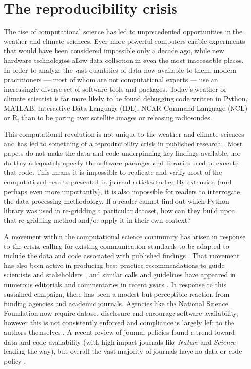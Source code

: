 \section{The reproducibility crisis}

The rise of computational science has led to unprecedented opportunities in the weather and climate sciences. Ever more powerful computers enable experiments that would have been considered impossible only a decade ago, while new hardware technologies allow data collection in even the most inaccessible places. In order to analyze the vast quantities of data now available to them, modern practitioners –-- most of whom are not computational experts –-- use an increasingly diverse set of software tools and packages. Today's weather or climate scientist is far more likely to be found debugging code written in Python, MATLAB, Interactive Data Language (IDL), NCAR Command Language (NCL) or R, than to be poring over satellite images or releasing radiosondes. 

This computational revolution is not unique to the weather and climate sciences and has led to something of a reproducibility crisis in published research \citep[e.g.][]{Peng2011}. Most papers do not make the data and code underpinning key findings available, nor do they adequately specify the software packages and libraries used to execute that code. This means it is impossible to replicate and verify most of the computational results presented in journal articles today. By extension (and perhaps even more importantly), it is also impossible for readers to interrogate the data processing methodology. If a reader cannot find out which Python library was used in re-gridding a particular dataset, how can they build upon that re-gridding method and/or apply it in their own context? 

A movement within the computational science community has arisen in response to the crisis, calling for existing communication standards to be adapted to include the data and code associated with published findings \citep[e.g.][]{Stodden2014}. That movement has also been active in producing best practice recommendations to guide scientists and stakeholders \citep[e.g.][]{Prlic2012,Stodden2012a,Sandve2013,Stodden2014}, and similar calls and guidelines have appeared in numerous editorials and commentaries in recent years \citep[e.g.][]{Barnes2010,Merali2010,Ince2012}. In response to this sustained campaign, there has been a modest but perceptible reaction from funding agencies and academic journals. Agencies like the National Science Foundation now require dataset disclosure and encourage software availability, however this is not consistently enforced and compliance is largely left to the authors themselves \citep{Stodden2013}. A recent review of journal policies found a trend toward data and code availability (with high impact journals like \textit{Nature} and \textit{Science} leading the way), but overall the vast majority of journals have no data or code policy \citep{Stodden2013}. 

